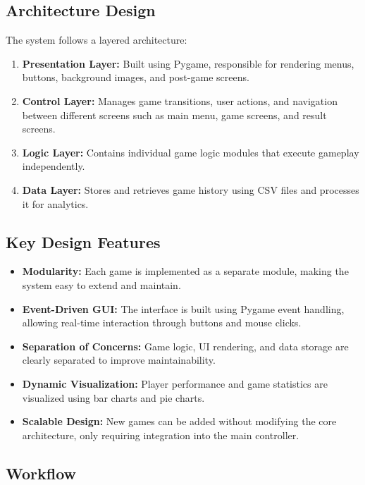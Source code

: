\documentclass[12pt]{article}
\begin{document}
\subsection{Architecture Design}

The system follows a layered architecture:

\begin{enumerate}
    \item \textbf{Presentation Layer:} Built using Pygame, responsible for rendering menus, buttons, background images, and post-game screens.
    \item \textbf{Control Layer:} Manages game transitions, user actions, and navigation between different screens such as main menu, game screens, and result screens.
    \item \textbf{Logic Layer:} Contains individual game logic modules that execute gameplay independently.
    \item \textbf{Data Layer:} Stores and retrieves game history using CSV files and processes it for analytics.
\end{enumerate}

\subsection{Key Design Features}

\begin{itemize}
    \item \textbf{Modularity:} Each game is implemented as a separate module, making the system easy to extend and maintain.
    \item \textbf{Event-Driven GUI:} The interface is built using Pygame event handling, allowing real-time interaction through buttons and mouse clicks.
    \item \textbf{Separation of Concerns:} Game logic, UI rendering, and data storage are clearly separated to improve maintainability.
    \item \textbf{Dynamic Visualization:} Player performance and game statistics are visualized using bar charts and pie charts.
    \item \textbf{Scalable Design:} New games can be added without modifying the core architecture, only requiring integration into the main controller.
\end{itemize}

\subsection{Workflow}
\end{document}

